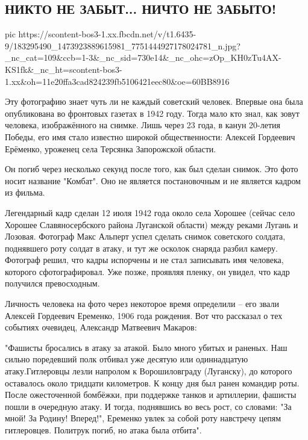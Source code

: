  
 
 
 
 

\subsection{НИКТО НЕ ЗАБЫТ...  НИЧТО НЕ ЗАБЫТО!}
\label{sec:06_05_2021.fb.maslov_evgenij.1.politruk}

\ifcmt
  pic https://scontent-bos3-1.xx.fbcdn.net/v/t1.6435-9/183295490_1473923889615981_7751444927178024781_n.jpg?_nc_cat=109&ccb=1-3&_nc_sid=730e14&_nc_ohc=zOp_KH0zTu4AX-KS1fk&_nc_ht=scontent-bos3-1.xx&oh=11e20ffa3cad824239fb5106421eec80&oe=60BB8916
\fi

Эту фотографию знает чуть ли не каждый советский человек. Впервые она была
опубликована во фронтовых газетах в 1942 году. Тогда мало кто знал, как зовут
человека, изображённого на снимке. Лишь через 23 года, в канун 20-летия Победы,
его имя стало известно широкой общественности: Алексей Гордеевич Ерёменко,
уроженец села Терсянка Запорожской области.

Он погиб через несколько секунд после того, как был сделан снимок. Это фото
носит название "Комбат". Оно не является постановочным и не является кадром из
фильма.

Легендарный кадр сделан 12 июля 1942 года около села Хорошее (сейчас село
Хорошее Славяносербского района Луганской области) между реками Лугань и
Лозовая. Фотограф Макс Альперт успел сделать снимок советского солдата,
поднявшего роту солдат в атаку, и тут же осколок снаряда разбил камеру.
Фотограф решил, что кадры испорчены и не стал записывать имя человека, которого
сфотографировал. Уже позже, проявляя пленку, он увидел, что кадр получился
превосходным.

Личность человека на фото через некоторое время определили – его звали Алексей
Гордеевич Еременко, 1906 года рождения. Вот что рассказал о тех событиях
очевидец, Александр Матвеевич Макаров:

"Фашисты бросались в атаку за атакой. Было много убитых и раненых. Наш сильно
поредевший полк отбивал уже десятую или одиннадцатую атаку.Гитлеровцы лезли
напролом к Ворошиловграду (Луганску), до которого оставалось около тридцати
километров. К концу дня был ранен командир роты. После ожесточенной бомбёжки,
при поддержке танков и артиллерии, фашисты пошли в очередную атаку. И тогда,
поднявшись во весь рост, со словами: "За мной! За Родину! Вперед!", Еременко
увлек за собой роту навстречу цепям гитлеровцев. Политрук погиб, но атака была
отбита".

